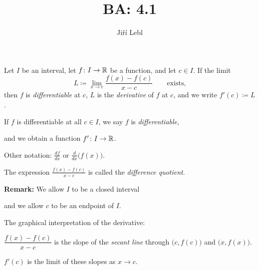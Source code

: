 \documentclass[10pt,aspectratio=169]{beamer}
\author{Ji\v{r}\'i Lebl}
\institute[OSU]{%
Departemento pri Matematiko de Oklahoma {\^S}tata Universitato}
\title{BA: 4.1}
\date{}
\begin{document}
\begin{frame}
\titlepage
\end{frame}

\begin{frame}
\begin{definition}
Let $I$ be an interval, let
$f \colon I \to {\mathbb{R}}$ be a function, and let $c \in I$.
\pause
If the limit
\begin{equation*}
L \coloneqq \lim_{x \to c} \frac{f(x)-f(c)}{x-c} \qquad \text{exists,}
\end{equation*}
\pause
then $f$ is
\emph{differentiable} at
$c$, $L$ is the \emph{derivative} of $f$ at $c$,
and we write $f'(c) \coloneqq L$.

\pause
\medskip

If $f$ is differentiable at all $c \in I$, we say
$f$ is \emph{differentiable},

and we obtain a function $f' \colon I \to {\mathbb{R}}$.

\pause
\medskip

Other notation: $\frac{df}{dx}$ or $\frac{d}{dx}\bigl( f(x) \bigr)$.

\pause
\medskip

The expression $\frac{f(x)-f(c)}{x-c}$ is called the
\emph{difference quotient}.
\end{definition}

\pause
\textbf{Remark:}
We allow $I$ to be a closed interval

and we allow $c$ to be an endpoint of $I$.

\end{frame}

\begin{frame}
The graphical interpretation of the derivative:

\medskip

\begin{center}
\end{center}

\pause
\medskip

$\dfrac{f(x)-f(c)}{x-c}$ is the slope of the \emph{secant line}
through $\bigl(c,f(c)\bigr)$ and $\bigl(x,f(x)\bigr)$.

\pause
\medskip

$f'(c)$ is the limit of these slopes as $x \to c$.

\end{frame}
\end{document}
